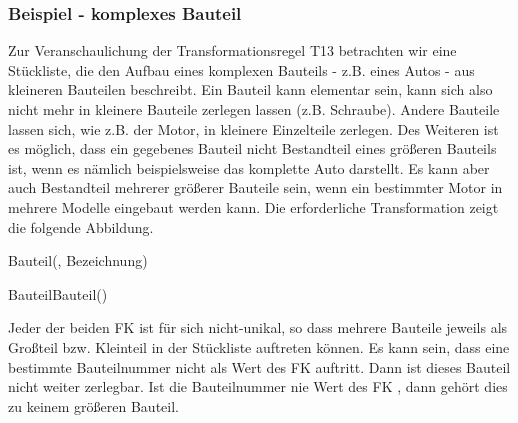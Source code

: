         \subsubsection{Beispiel - komplexes Bauteil}
          Zur Veranschaulichung der Transformationsregel T13 betrachten wir eine St\"uckliste, die den Aufbau eines komplexen Bauteils - z.B. eines Autos - aus kleineren Bauteilen beschreibt. Ein Bauteil kann elementar sein, kann sich also nicht mehr in kleinere Bauteile zerlegen lassen (z.B. Schraube). Andere Bauteile lassen sich, wie z.B. der Motor, in kleinere Einzelteile zerlegen. Des Weiteren ist es m\"oglich, dass ein gegebenes Bauteil nicht Bestandteil eines gr\"o\ss eren Bauteils ist, wenn es n\"amlich beispielsweise das komplette Auto darstellt. Es kann aber auch Bestandteil mehrerer gr\"o\ss erer Bauteile sein, wenn ein bestimmter Motor in mehrere Modelle eingebaut werden kann. Die erforderliche Transformation zeigt die folgende Abbildung.
          \begin{center}
          \end{center}
          \begin{small}
            Bauteil(, Bezeichnung)

            BauteilBauteil()
          \end{small}

          Jeder der beiden FK ist f\"ur sich nicht-unikal, so dass mehrere Bauteile jeweils als Gro\ss teil bzw. Kleinteil in der St\"uckliste auftreten k\"onnen. Es kann sein, dass eine bestimmte Bauteilnummer nicht als Wert des FK  auftritt. Dann ist dieses Bauteil nicht weiter zerlegbar. Ist die Bauteilnummer nie Wert des FK , dann geh\"ort dies zu keinem gr\"o\ss eren Bauteil.

